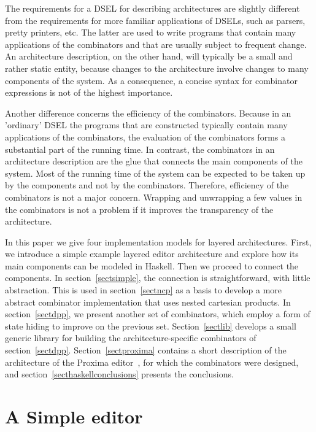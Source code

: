 The requirements for a DSEL for describing architectures are slightly different from the requirements for more familiar applications of DSELs, such as parsers, pretty printers, etc. The latter are used to write programs that contain many applications of the combinators and that are usually subject to frequent change. An architecture description, on the other hand, will typically be a small and rather static entity, because changes to the architecture involve changes to many components of the system. As a consequence, a concise syntax for combinator expressions is not of the highest importance.

Another difference concerns the efficiency of the combinators. Because in an 'ordinary' DSEL the programs that are constructed typically contain many applications of the combinators, the evaluation of the combinators forms a substantial part of the running time. In contrast, the combinators in an architecture description are the glue that connects the main components of the system. Most of the running time of the system can be expected to be taken up by the components and not by the combinators. Therefore, efficiency of the combinators is not a major concern. Wrapping and unwrapping a few values in the combinators is not a problem if it improves the transparency of the architecture.

 In this paper we give four implementation models for layered architectures. First, we introduce a simple example layered editor architecture and explore how its main components can be modeled in Haskell. Then we proceed to connect the components. In section~\ref{sectsimple}, the connection is straightforward, with little abstraction. This is used in section~\ref{sectncp} as a basis to develop a more abstract combinator implementation that uses nested cartesian products. In section~\ref{sectdpp}, we present another set of combinators, which employ a form of state hiding to improve on the previous set. Section~\ref{sectlib} develops a small generic library for building the architecture-specific combinators of section~\ref{sectdpp}. Section~\ref{sectproxima} contains a short description of the architecture of the Proxima editor~\cite{proxima}, for which the combinators were designed, and section~\ref{secthaskellconclusions} presents the conclusions.


%									
%									
%									
\section{A Simple editor}

